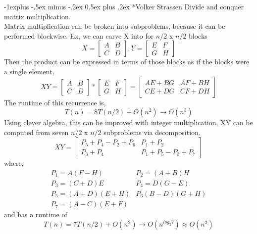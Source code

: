 \documentclass[3pt,landscape]{article}
\makeatletter
\renewcommand{\subsection}{\@startsection{subsection}{2}{0mm}%
                            {-1explus -.5ex minus -.2ex}%
                            {0.5ex plus .2ex}%
                            {\normalfont\normalsize\bfseries}}
\makeatother
\begin{document}
\begin{multicols}{3}
\subsection*{Volker Strassen}
Divide and conquer matrix multiplication.\\
Matrix multiplication can be broken into subproblems, because it can be performed blockwise. Ex, we can carve X into for \(n/2\) x \(n/2\) blocks
\[X = \begin{bmatrix} A & B \\ C & D \end{bmatrix}, Y = \begin{bmatrix} E & F\\ G & H \end{bmatrix}\]
Then the product can be expressed in terms of those blocks as if the blocks were a single element,
\[XY = \begin{bmatrix} A & B \\ C & D \end{bmatrix} * \begin{bmatrix} E & F\\ G & H \end{bmatrix} = \begin{bmatrix} AE+BG & AF+BH \\ CE+DG & CF+DH \end{bmatrix}\]
The runtime of this recurrence is,
\[T(n)=8T(n/2)+O(n^{2}) \rightarrow O(n^{3})\]
Using clever algebra, this can be improved with integer multiplication, XY can be computed from seven \(n/2\) x \(n/2\) subproblems via decomposition.
\[XY = \begin{bmatrix} P_{5}+P_{4}-P_{2}+P_{6} & P_{1}+P_{2} \\ P_{3}+P_{4} & P_{1}+P_{5}-P_{3}+P_{7} \end{bmatrix}\]
where,
\[\begin{array}{ll}
        P_{1}=A(F-H) & P_{2}=(A+B)H\\
        P_{3}=(C+D)E & P_{4}=D(G-E)\\
        P_{5}=(A+D)(E+H) & P_{6}(B-D)(G+H)\\
        P_{7}=(A-C)(E+F) & \texttt{ }
\end{array}\]
and has a runtime of
\[T(n)=7T(n/2)+O(n^{2}) \rightarrow O(n^{log_{2}7}) \approx O(n^{2})\]


\end{multicols}
\end{document}
